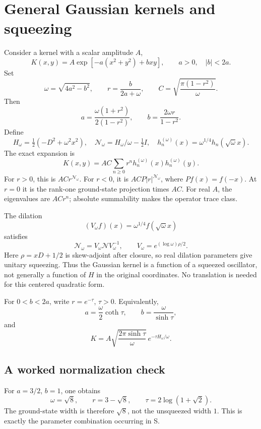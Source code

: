 \documentclass[11pt,reqno]{amsart}
\theoremstyle{remark}\newtheorem{remark}[proposition]{Remark}
\newcommand{\Id}{I}\newcommand{\NN}{\mathcal N}
\begin{document}
\section{General Gaussian kernels and squeezing}\label{sec:gaussian}
Consider a kernel with a scalar amplitude $A$,
\[
 K(x,y)=A\exp[-a(x^2+y^2)+bxy],\qquad a>0,\quad |b|<2a.
\]
Set
\begin{equation}\label{eq:abmatch}
 \omega=\sqrt{4a^2-b^2},\qquad r=\frac{b}{2a+\omega},\qquad
 C=\sqrt{\frac{\pi(1-r^2)}{\omega}}.
\end{equation}
Then
\[
 a=\frac{\omega(1+r^2)}{2(1-r^2)},\qquad
 b=\frac{2\omega r}{1-r^2}.
\]
Define
\[
 H_\omega=\tfrac12(-D^2+\omega^2x^2),\quad
 \NN_\omega=H_\omega/\omega-\tfrac12\Id,\quad
 h_n^{(\omega)}(x)=\omega^{1/4}h_n(\sqrt\omega x).
\]
The exact expansion is
\begin{equation}\label{eq:gauss-spectral}
 K(x,y)=AC\sum_{n\ge0}r^nh_n^{(\omega)}(x)h_n^{(\omega)}(y).
\end{equation}
For $r>0$, this is $ACr^{\NN_\omega}$. For $r<0$, it is
$AC P|r|^{\NN_\omega}$, where $Pf(x)=f(-x)$. At $r=0$ it is the
rank-one ground-state projection times $AC$.
For real $A$, the eigenvalues are $ACr^n$; absolute summability makes
the operator trace class.

The dilation
\[
 (V_\omega f)(x)=\omega^{1/4}f(\sqrt\omega x)
\]
satisfies
\[
 \NN_\omega=V_\omega\NN V_\omega^{-1},\qquad
 V_\omega=e^{(\log\omega)\rho/2}.
\]
Here $\rho=xD+1/2$ is skew-adjoint after closure, so real dilation
parameters give unitary squeezing. Thus the Gaussian kernel is a
function of a squeezed oscillator, not generally a function of $H$ in
the original coordinates. No translation is needed for this centered
quadratic form.

For $0<b<2a$, write $r=e^{-\tau}$, $\tau>0$. Equivalently,
\[
 a=\frac\omega2\coth\tau,\qquad b=\frac\omega{\sinh\tau},
\]
and
\begin{equation}\label{eq:gauss-heat}
 K=A\sqrt{\frac{2\pi\sinh\tau}{\omega}}\,
 e^{-\tau H_\omega/\omega}.
\end{equation}

\subsection{A worked normalization check}
For $a=3/2$, $b=1$, one obtains
\[
 \omega=\sqrt8,\qquad r=3-\sqrt8,\qquad
 \tau=2\log(1+\sqrt2).
\]
The ground-state width is therefore $\sqrt8$, not the unsqueezed width
$1$. This is exactly the parameter combination occurring in S.
\end{document}
